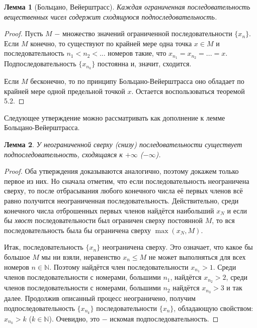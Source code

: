 \documentclass{article}
\newtheorem*{lemma}{Лемма}
\begin{document}
\begin{lemma}[Больцано, Вейерштрасс]
Каждая ограниченная последовательность вещественных чисел содержит сходящуюся подпоследовательность.
\end{lemma}

\begin{proof}
Пусть \(M\) \(-\) множество значений ограниченной последовательности \(\{x_n\}\). Если \(M\) конечно, то существуют по крайней мере одна точка \(x \in M\) и последовательность \(n_1 < n_2 < ...\) номеров такие, что \(x_{n_1} = x_{n_2} = ... = x\). Подпоследовательность \(\{x_{n_k}\}\) постоянна и, значит, сходится.

Если \(M\) бесконечно, то по принципу Больцано-Вейерштрасса оно обладает по крайней мере одной предельной точкой \(x\). Остается воспользоваться теоремой 5.2.
\end{proof}

Следующее утверждение можно рассматривать как дополнение к лемме Больцано-Вейерштрасса.

\begin{lemma}
У неограниченной сверху (снизу) последовательности существует подпоследовательность, сходящаяся к \(+ \infty\) (\(- \infty\)).
\end{lemma}

\begin{proof}
Оба утверждения доказываются аналогично, поэтому докажем только первое из них. Но сначала отметим, что если последовательность неограничена сверху, то после отбрасывания любого конечного числа её первых членов всё равно получится неограниченная последовательность. Действительно, среди конечного числа отброшенных первых членов найдётся наибольший \(x_N\) и если бы \textit{хвост} последовательности был ограничен сверху постоянной \(M\), то вся последовательность была бы ограничена сверху \(\max(x_N, M)\).

Итак, последовательность \(\{x_n\}\) неограничена сверху. Это означает, что какое бы большое \(M\) мы ни взяли, неравенство \(x_n \leq M\) не может выполняться для всех номеров \(n \in \mathbb{N}\). Поэтому найдётся член последовательности \(x_{n_1} > 1\). Среди членов последовательности с номерами, большими \(n_1\), найдётся \(x_{n_2} > 2\), среди членов последовательности с номерами, большими \(n_2\) найдётся \(x_{n_3} > 3\) и так далее. Продолжив описанный процесс неограничено, получим подпоследовательность \(\{x_{n_k}\}\) последовательности \(\{x_n\}\), обладающую свойством: \(x_{n_k} > k\) (\(k \in \mathbb{N}\)). Очевидно, это \(-\) искомая подпоследовательность.
\end{proof}
\end{document}
